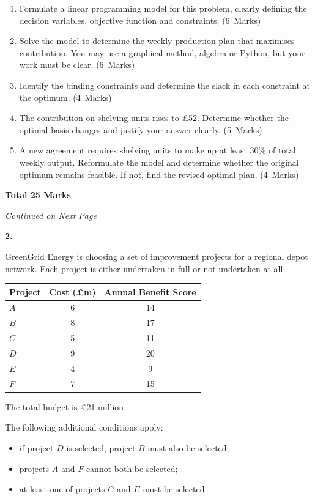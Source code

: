 \documentclass[11pt,a4paper]{article}
\newcommand{\continuednotice}{%
    \vfill
    \begin{center}
    \textit{Continued on Next Page}
    \end{center}
    \newpage
}
\newcommand{\markalloc}[1]{\nobreak\hfill\mbox{(#1 Marks)}}
\newcommand{\questiontotal}[1]{\begin{flushright}\textbf{Total #1 Marks}\end{flushright}}
\begin{document}
\begin{enumerate}
\item Formulate a linear programming model for this problem, clearly defining the decision variables, objective function and constraints. \markalloc{6}

\item Solve the model to determine the weekly production plan that maximises contribution. You may use a graphical method, algebra or Python, but your work must be clear. \markalloc{6}

\item Identify the binding constraints and determine the slack in each constraint at the optimum. \markalloc{4}

\item The contribution on shelving units rises to \pounds52. Determine whether the optimal basis changes and justify your answer clearly. \markalloc{5}

\item A new agreement requires shelving units to make up at least 30\% of total weekly output. Reformulate the model and determine whether the original optimum remains feasible. If not, find the revised optimal plan. \markalloc{4}
\end{enumerate}

\questiontotal{25}

\continuednotice

\textbf{2.}

GreenGrid Energy is choosing a set of improvement projects for a regional depot network.
Each project is either undertaken in full or not undertaken at all.

\begin{center}
\begin{tabular}{lcc}
\toprule
Project & Cost (\pounds m) & Annual Benefit Score \\
\midrule
$A$ & 6 & 14 \\
$B$ & 8 & 17 \\
$C$ & 5 & 11 \\
$D$ & 9 & 20 \\
$E$ & 4 & 9 \\
$F$ & 7 & 15 \\
\bottomrule
\end{tabular}
\end{center}

The total budget is \pounds21 million.

The following additional conditions apply:
\begin{itemize}[leftmargin=0.9cm, itemsep=0.25em]
\item if project $D$ is selected, project $B$ must also be selected;
\item projects $A$ and $F$ cannot both be selected;
\item at least one of projects $C$ and $E$ must be selected.
\end{itemize}
\end{document}
